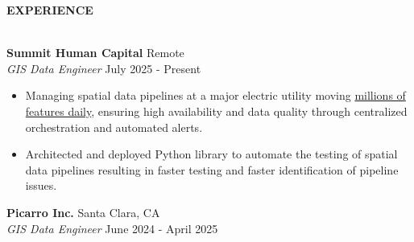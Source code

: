\documentclass[letterpaper]{article}
\newcommand{\lineunder} {
        \vspace*{-8pt} \\
        \hspace*{-18pt} \hrulefill \\
    }
\newcommand{\header} [1] {
        \vspace{9pt}
        {\hspace*{-18pt}\vspace*{6pt} \large \textbf {#1}}
        \vspace*{-6pt} \lineunder
        \vspace{2pt}
    }
\newcommand{\employer}[4]{
        \vspace{3pt}
        \textbf{#1}  %
        \hfill #2\\  %
        \textit{#3}  %
        \hfill #4\\  %
        \vspace{3mm}
    }
\newenvironment{jobtasklist}
        {
            \vspace{-12pt}
            \begin{itemize} \itemsep 0pt
        }{
            \end{itemize}
            \vspace{-3pt}
        }
\newcommand{\impt}[1]{\uline{#1}}
\begin{document}
\header{EXPERIENCE}



\employer
    {Summit Human Capital}
    {Remote}
    {GIS Data Engineer}
    {July 2025 - Present}

\begin{jobtasklist}
    \item Managing spatial data pipelines at a major electric utility moving
            \impt{millions of features daily}, ensuring high availability and
            data quality through centralized orchestration and automated alerts.
    \item Architected and deployed Python library to automate the testing of spatial data pipelines
            resulting in faster testing and faster identification of pipeline issues.
\end{jobtasklist}

\employer
    {Picarro Inc.}
    {Santa Clara, CA}
    {GIS Data Engineer}
    {June 2024 - April 2025}
\end{document}
